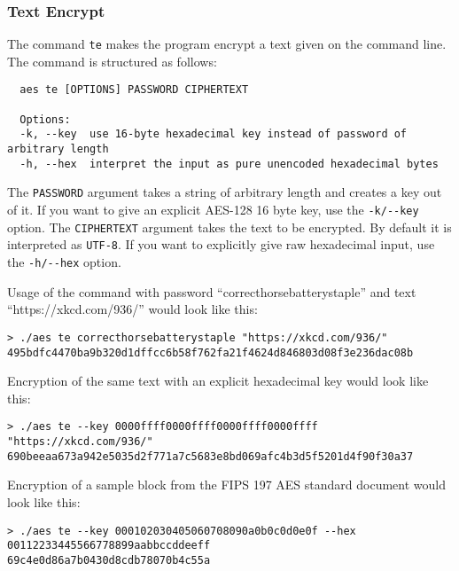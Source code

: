 \subsubsection{Text Encrypt}
The command \lstinline{te} makes the program encrypt a text given on the command line. The command is structured as follows:
\begin{lstlisting}
  aes te [OPTIONS] PASSWORD CIPHERTEXT

  Options:
  -k, --key  use 16-byte hexadecimal key instead of password of arbitrary length
  -h, --hex  interpret the input as pure unencoded hexadecimal bytes
\end{lstlisting}

The \lstinline{PASSWORD} argument takes a string of arbitrary length and creates a key out of it. If you want to give an explicit AES-128 16 byte key, use the \lstinline{-k/--key} option. The \lstinline{CIPHERTEXT} argument takes the text to be encrypted. By default it is interpreted as \lstinline{UTF-8}. If you want to explicitly give raw hexadecimal input, use the \lstinline{-h/--hex} option.

Usage of the command with password \enquote{correcthorsebatterystaple} and text \enquote{https://xkcd.com/936/} would look like this:
\begin{lstlisting}
> ./aes te correcthorsebatterystaple "https://xkcd.com/936/"
495bdfc4470ba9b320d1dffcc6b58f762fa21f4624d846803d08f3e236dac08b
\end{lstlisting}

Encryption of the same text with an explicit hexadecimal key would look like this:
\begin{lstlisting}
> ./aes te --key 0000ffff0000ffff0000ffff0000ffff "https://xkcd.com/936/"
690beeaa673a942e5035d2f771a7c5683e8bd069afc4b3d5f5201d4f90f30a37
\end{lstlisting}

Encryption of a sample block from the FIPS 197 AES standard document \cite{aes2001} would look like this:
\begin{lstlisting}
> ./aes te --key 000102030405060708090a0b0c0d0e0f --hex 00112233445566778899aabbccddeeff
69c4e0d86a7b0430d8cdb78070b4c55a
\end{lstlisting}


